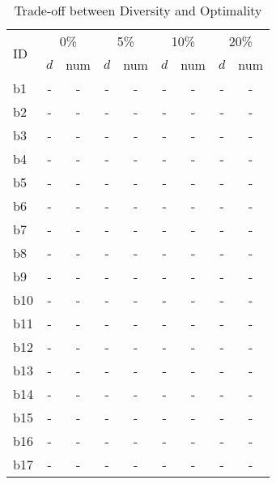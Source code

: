 \begin{longtable}{|l|c|c|c|c|c|c|c|c|}
\caption{\label{tab:agaps} Trade-off between Diversity and Optimality}\\
\hline
\multirow{2}{*}{ID}&\multicolumn{2}{c|}{0\%}&\multicolumn{2}{c|}{5\%}&\multicolumn{2}{c|}{10\%}&\multicolumn{2}{c|}{20\%}\\
\cline{2-9}
&$d$&num&$d$&num&$d$&num&$d$&num\\
\hline
b1&- & -&- & -&- & -&- & -
\\
b2&- & -&- & -&- & -&- & -
\\
b3&- & -&- & -&- & -&- & -
\\
b4&- & -&- & -&- & -&- & -
\\
b5&- & -&- & -&- & -&- & -
\\
b6&- & -&- & -&- & -&- & -
\\
b7&- & -&- & -&- & -&- & -
\\
b8&- & -&- & -&- & -&- & -
\\
b9&- & -&- & -&- & -&- & -
\\
b10&- & -&- & -&- & -&- & -
\\
b11&- & -&- & -&- & -&- & -
\\
b12&- & -&- & -&- & -&- & -
\\
b13&- & -&- & -&- & -&- & -
\\
b14&- & -&- & -&- & -&- & -
\\
b15&- & -&- & -&- & -&- & -
\\
b16&- & -&- & -&- & -&- & -
\\
b17&- & -&- & -&- & -&- & -
\\
\hline
\end{longtable}
